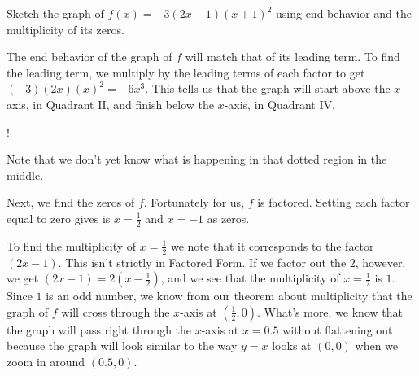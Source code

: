 \documentclass{ximera}
\begin{document}
\begin{example}
Sketch the graph of $f(x) = -3(2x-1)(x+1)^2$ using end behavior and the multiplicity of its zeros.
\begin{explanation}
The end behavior of the graph of $f$ will match that of its leading term.  To find the leading term, we multiply by the leading terms of each factor to get $(-3)(2x)(x)^2 = -6x^3$.  This tells us that the graph will start above the $x$-axis, in Quadrant II, and finish below the $x$-axis, in Quadrant IV.  

\resizebox {5 cm} {!} { 
            }

Note that we don't yet know what is happening in that dotted region in the middle.

Next, we find the zeros of $f$.  Fortunately for us, $f$ is factored.  Setting each factor equal to zero gives is $x = \frac{1}{2}$ and $x=-1$ as zeros. 

To find the multiplicity of $x=\frac{1}{2}$ we note that it corresponds to the factor $(2x-1)$.  This isn't strictly in Factored Form.  If we factor out the $2$, however, we get $(2x-1) = 2\left(x-\frac{1}{2}\right)$, and we see that the multiplicity of $x = \frac{1}{2}$ is $1$.  Since $1$ is an odd number, we know from our theorem about multiplicity that the graph of $f$ will cross through the $x$-axis at $\left(\frac{1}{2},0\right)$.   What's more, we know that the graph will pass right through the $x$-axis at $x=0.5$ without flattening out because the graph will look similar to the way $y=x$ looks at $(0,0)$ when we zoom in around $(0.5,0)$. 


\end{explanation}
\end{example}
\end{document}
